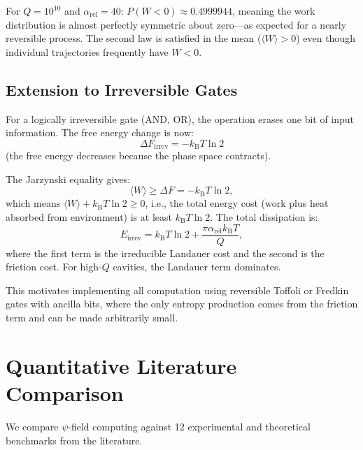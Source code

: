 \documentclass[11pt,twocolumn]{article}
\theoremstyle{definition}
\theoremstyle{remark}
\newcommand{\kB}{k_{\mathrm{B}}}
\begin{document}
For $Q = 10^{10}$ and $\alpha_{\mathrm{rel}} = 40$: $P(W < 0) \approx
0.4999944$, meaning the work distribution is almost perfectly symmetric
about zero---as expected for a nearly reversible process. The second law
is satisfied in the mean ($\langle W\rangle > 0$) even though individual
trajectories frequently have $W < 0$.

\subsection{Extension to Irreversible Gates}\label{sec:irreversible}

For a logically irreversible gate (AND, OR), the operation erases one
bit of input information. The free energy change is now:
\begin{equation}
\Delta F_{\mathrm{irrev}} = -\kB T\ln 2
\end{equation}
(the free energy decreases because the phase space contracts).

The Jarzynski equality gives:
\begin{equation}
\langle W\rangle \geq \Delta F = -\kB T\ln 2,
\end{equation}
which means $\langle W\rangle + \kB T\ln 2 \geq 0$, i.e., the total
energy cost (work plus heat absorbed from environment) is at least
$\kB T\ln 2$. The total dissipation is:
\begin{equation}
E_{\mathrm{irrev}} = \kB T\ln 2 + \frac{\pi\alpha_{\mathrm{rel}}\kB T}{Q},
\label{eq:irrev_dissipation}
\end{equation}
where the first term is the irreducible Landauer cost and the second is
the friction cost. For high-$Q$ cavities, the Landauer term dominates.

This motivates implementing all computation using reversible Toffoli or
Fredkin gates with ancilla bits, where the only entropy production comes
from the friction term and can be made arbitrarily small.

\section{Quantitative Literature Comparison}\label{sec:literature}

We compare $\psi$-field computing against 12 experimental and
theoretical benchmarks from the literature.
\end{document}
